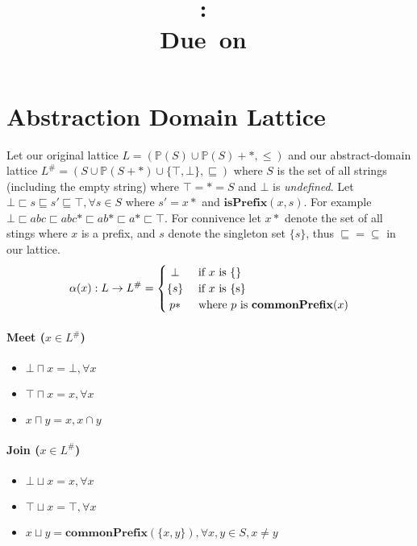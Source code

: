 \documentclass{article}
\title{
\vspace{2in}
\textmd{\textbf{\hmwkClass:\ \hmwkTitle}}\\
\normalsize\vspace{0.1in}\small{Due\ on\ \hmwkDueDate}\\
\vspace{0.1in}\large{\textit{\hmwkClassInstructor}}
\vspace{3in}
}
\author{\textbf{\hmwkAuthorName}}
\date{} %
\newcommand{\powerset}[1]{\mathbb{P}(#1)}
\begin{document}
\maketitle
\newpage



\section{Abstraction Domain Lattice}
Let our original lattice $L = (\powerset{S}\cup\powerset{S}+*, \leq)$ and our abstract-domain lattice $L^\# = (S \cup \powerset{S+*} \cup \{ \top,\bot \},\sqsubseteq)$ where $S$ is the set of all strings (including the empty string) where $\top = * = S$ and $\bot$ is \emph{undefined}. Let $\bot \sqsubset s \sqsubseteq s' \sqsubseteq \top, \forall s \in S$ where $s' = x*$ and $\mathbf{isPrefix}(x,s)$. For example $ \bot \sqsubset abc  \sqsubset abc* \sqsubset ab* \sqsubset a* \sqsubset \top$. For connivence let $x*$ denote the set of all stings where $x$ is a prefix, and $s$ denote the singleton set $\{s\}$, thus $\sqsubseteq = \subseteq$ in our lattice.
\[
 \alpha(x): L \rightarrow L^\# =
  \begin{cases} 
      \hfill \bot    \hfill & \text{ if $x$ is \{\}} \\
      \hfill \{s\} \hfill & \text{ if $x$ is \{s\}} \\
      \hfill p* \hfill & \text{ where $p$ is $\mathbf{commonPrefix}(x)$} \\
  \end{cases}
\]

\paragraph{Meet ($x \in L^\#$)}
\begin{itemize}
	\item $\bot \sqcap x = \bot, \forall x$
	\item $\top \sqcap x = x, \forall x$
	\item $x \sqcap y = x, x\cap y$
\end{itemize}
\paragraph{Join ($x \in L^\#$)}
\begin{itemize}
	\item $\bot \sqcup x = x, \forall x$
	\item $\top \sqcup x = \top, \forall x$
	\item $x \sqcup y = \mathbf{commonPrefix}(\{x,y\}), \forall x,y \in S, x \neq y$
\end{itemize}
\end{document}
